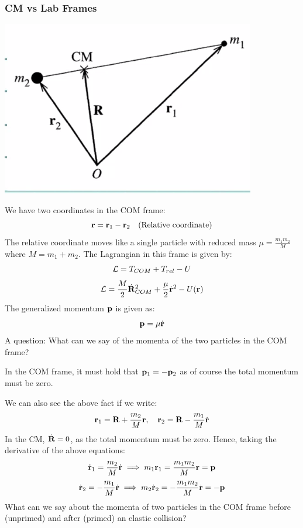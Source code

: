 \subsubsection{CM vs Lab Frames}
\begin{center}
    \includegraphics[scale=0.5]{Lecture-29/l29-img1.png}
\end{center}
We have two coordinates in the COM frame:
\[\mathbf{r} = \mathbf{r}_1 - \mathbf{r}_2 \quad \text{(Relative coordinate)}\]
The relative coordinate moves like a single particle with reduced mass $\mu = \frac{m_1m_2}{M}$ where $M = m_1 + m_2$. The Lagrangian in this frame is given by:
\[\mathcal{L} = T_{COM} + T_{rel} - U\]
\[\mathcal{L} = \frac{M}{2}\dot{\mathbf{R}}_{COM}^2 + \frac{\mu}{2}\dot{\mathbf{r}}^2 - U(\mathbf{r})\]
The generalized momentum $\mathbf{p}$ is given as:
\[\mathbf{p} = \mu \dot{\mathbf{r}}\]
A question: What can we say of the momenta of the two particles in the COM frame?
\begin{s}
In the COM frame, it must hold that $\mathbf{p}_1 = -\mathbf{p}_2$ as of course the total momentum must be zero.
\end{s}
We can also see the above fact if we write:
\[\mathbf{r}_1 = \mathbf{R} + \frac{m_2}{M}\mathbf{r}, \quad \mathbf{r}_2 = \mathbf{R} - \frac{m_1}{M}\dot{\mathbf{r}}\]
In the CM, $\dot{\mathbf{R}} = 0$, as the total momentum must be zero. Hence, taking the derivative of the above equations:
\[\dot{\mathbf{r}}_1 = \frac{m_2}{M}\dot{\mathbf{r}} \implies m_1\mathbf{r}_1 = \frac{m_1m_2}{M}\mathbf{r} = \mathbf{p}\]
\[\dot{\mathbf{r}}_2 = - \frac{m_1}{M}\dot{\mathbf{r}} \implies m_2\dot{\mathbf{r}}_2 = - \frac{m_1m_2}{M}\dot{\mathbf{r}} = -\mathbf{p}\]
What can we say about the momenta of two particles in the COM frame before (unprimed) and after (primed) an elastic collision?

